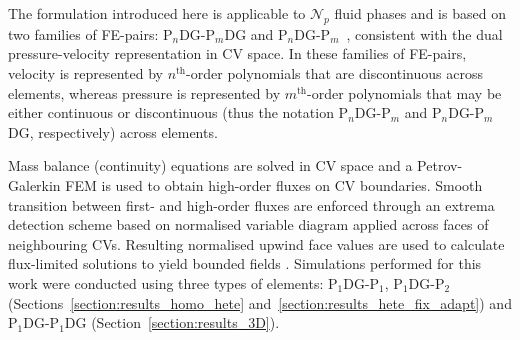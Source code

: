 \documentclass[preprint,authoryear,12pt]{elsarticle}
\newcommand{\PN}[2][error]{P$_{#1}$DG-P$_{#2}$}
\newcommand{\PNDG}[2][error]{P$_{#1}$DG-P$_{#2}$DG}
\newcommand{\eg}{{\it e.g., }}
\begin{document}



\medskip
The formulation introduced here is applicable to $\mathcal{N}_{p}$ fluid phases and is based on two families of FE-pairs: \PNDG[n]{m} and \PN[n]{m}~\citep{cotter_2009a}, consistent with the dual pressure-velocity representation in CV space. In these families of FE-pairs, velocity is represented by $n^{\text{th}}$-order polynomials that are discontinuous across elements, whereas pressure is represented by $m^{\text{th}}$-order polynomials that may be either continuous or discontinuous (thus the notation \PN[n]{m} and \PNDG[n]{m}, respectively) across elements. 

Mass balance (continuity) equations are solved in CV space and a Petrov-Galerkin FEM is used to obtain high-order fluxes on CV boundaries. Smooth transition between first- and high-order fluxes are enforced through an extrema detection scheme based on normalised variable diagram \citep[NVD,][]{jasak_1999,darwish_2003} applied across faces of neighbouring CVs. Resulting normalised upwind face values are used to calculate flux-limited solutions \citep[based on total variation diminishing criteria, TVD,][]{piperno_1998} to yield bounded fields \citep[\eg positive densities, saturations bounded between 0 and 1 etc. See][for more details on the flux-limiting scheme within the model]{gomes_book_2012}. Simulations performed for this work were conducted using three types of elements: \PN[1]{1}, \PN[1]{2} (Sections~\ref{section:results_homo_hete} and~\ref{section:results_hete_fix_adapt}) and \PNDG[1]{1} (Section~\ref{section:results_3D}).
\end{document}
